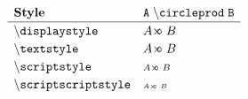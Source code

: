 \documentclass[varwidth, border = 3pt]{standalone}
\newcommand{\simpletest}%
           {A \circleprod B}
\newcommand{\verbtest}%
           {A \mathmacro{circleprod} B}
\newcommand{\testmathstyle}{
  \[
    \renewcommand{\arraystretch}{1.2}%
    \begin{array}{lll}
        \textbf{Style}
      & \mathtt{\verbtest}
      \\ \hline
        \txtmacro{displaystyle}
      & \displaystyle \simpletest
      \\
        \txtmacro{textstyle}
      & \textstyle \simpletest
      \\
        \txtmacro{scriptstyle}
      & \scriptstyle \simpletest
      \\
        \txtmacro{scriptscriptstyle}
      & \scriptscriptstyle \simpletest
    \end{array}
  \]
}
\begin{document}
\testmathstyle
\end{document}
